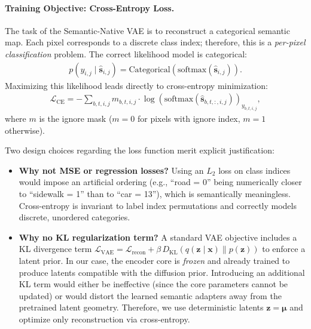\paragraph{Training Objective: Cross-Entropy Loss.}
The task of the Semantic-Native VAE is to reconstruct a categorical semantic map. Each pixel corresponds to a discrete class index; therefore, this is a \emph{per-pixel classification} problem. The correct likelihood model is categorical:
\begin{align}
    p(y_{i,j} \mid \hat{\mathbf{s}}_{i,j}) = \text{Categorical}\!\left(\text{softmax}(\hat{\mathbf{s}}_{i,j})\right).
    \label{eq:categorical_likelihood}
\end{align}
Maximizing this likelihood leads directly to cross-entropy minimization:
\begin{align}
    \mathcal{L}_{\text{CE}} = -\sum_{b,t,i,j} m_{b,t,i,j} \cdot \log\!\left(\text{softmax}(\hat{\mathbf{s}}_{b,t,:,i,j})\right)_{y_{b,t,i,j}},
    \label{eq:ce_loss}
\end{align}
where $m$ is the ignore mask ($m = 0$ for pixels with ignore index, $m = 1$ otherwise).

Two design choices regarding the loss function merit explicit justification:

\begin{itemize}
    \item \textbf{Why not MSE or regression losses?} Using an $L_2$ loss on class indices would impose an artificial ordering (e.g., ``road = 0'' being numerically closer to ``sidewalk = 1'' than to ``car = 13''), which is semantically meaningless. Cross-entropy is invariant to label index permutations and correctly models discrete, unordered categories.

    \item \textbf{Why no KL regularization term?} A standard VAE objective includes a KL divergence term $\mathcal{L}_{\text{VAE}} = \mathcal{L}_{\text{recon}} + \beta\, D_{\text{KL}}(q(\mathbf{z} \mid \mathbf{x}) \| p(\mathbf{z}))$ to enforce a latent prior. In our case, the encoder core is \emph{frozen} and already trained to produce latents compatible with the diffusion prior. Introducing an additional KL term would either be ineffective (since the core parameters cannot be updated) or would distort the learned semantic adapters away from the pretrained latent geometry. Therefore, we use deterministic latents $\mathbf{z} = \boldsymbol{\mu}$ and optimize only reconstruction via cross-entropy.
\end{itemize}

